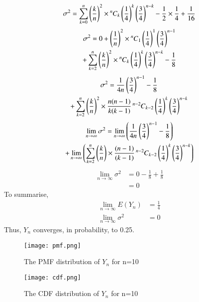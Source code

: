 \documentclass[journal,12pt,twocolumn]{IEEEtran}
\begin{document}
\begin{align}
     \sigma ^{2} = \sum_{k=0}^{n} \brak{\frac{k}{n}}^2 \times  \comb[n]{k}\brak{\frac{1}{4}}^{k} \brak{\frac{3}{4}}^{n-k}
      - \frac{1}{2} \times \frac{1}{4} + \frac{1}{16} 
\end{align}
\begin{multline}
    \sigma ^{2} = 0 + \brak{\frac{1}{n}}^2 \times  \comb[n]{1}\brak{\frac{1}{4}}^{1} \brak{\frac{3}{4}}^{n-1} 
    \\+ \sum_{k=2}^{n} \brak{\frac{k}{n}}^2 \times  \comb[n]{k}\brak{\frac{1}{4}}^{k} \brak{\frac{3}{4}}^{n-k} -\frac{1}{8}
\end{multline}
\begin{multline}
    \sigma ^{2} = \frac{1}{4n}\brak{\frac{3}{4}}^{n-1}-\frac{1}{8} 
    \\+ \sum_{k=2}^{n} \brak{\frac{k}{n}}^2 \times\frac{n(n-1)}{k(k-1)}  \comb[n-2]{k-2}\brak{\frac{1}{4}}^{k} \brak{\frac{3}{4}}^{n-k}
\end{multline}
\begin{multline}
    \lim_{n\rightarrow\infty}  \sigma ^{2} = \lim_{n\rightarrow\infty}\brak{ \frac{1}{4n}\brak{\frac{3}{4}}^{n-1}-\frac{1}{8}}
    \\+\lim_{n\rightarrow\infty}\brak{\sum_{k=2}^{n} \brak{\frac{k}{n}} \times\frac{(n-1)}{(k-1)}  \comb[n-2]{k-2}\brak{\frac{1}{4}}^{k} \brak{\frac{3}{4}}^{n-k}}
\end{multline}
\begin{align}
    \lim_{n\rightarrow\infty}  \sigma ^{2} &= 0 - \frac{1}{8} + \frac{1}{8}
    \\&= 0
\end{align}
To summarise,
\begin{align}
    \lim_{n\rightarrow \infty} E(Y_n) &= \frac{1}{4}
    \\\lim_{n\rightarrow\infty}  \sigma ^{2} &= 0
\end{align}
Thus, $Y_n$ converges, in probability, to 0.25. 
\begin{figure} [H]
    \texttt{[image: pmf.png]}
    \caption{The PMF distribution of $Y_n$ for n=10}
    \label{Fig 1}
\end{figure}
\begin{figure} [H]
    \texttt{[image: cdf.png]}
    \caption{The CDF distribution of $Y_n$ for n=10}
    \label{Fig 2}
\end{figure}
\end{document}
